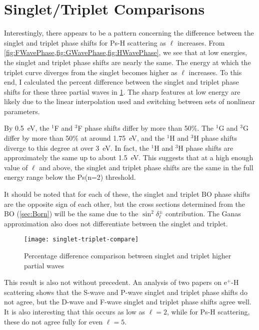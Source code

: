 \documentclass[Dissertation.tex]{subfiles}
\begin{document}
\section{Singlet/Triplet Comparisons}
\label{sec:SingTripCompare}

Interestingly, there appears to be a pattern concerning the difference between
the singlet and triplet phase shifts for Ps-H scattering as $\ell$ increases.
From \cref{fig:FWavePhase,fig:GWavePhase,fig:HWavePhase}, we see that at low
energies, the singlet and triplet phase shifts are nearly the same. The energy
at which the triplet curve diverges from the singlet becomes higher as $\ell$
increases. To this end, I calculated the percent difference between the singlet
and triplet phase shifts for these three partial waves in
\cref{fig:singlet-triplet-compare}. The sharp features at low energy are likely
due to the linear interpolation used and switching between sets of nonlinear 
parameters.

By \SI{0.5}{eV}, the $^1$F and $^3$F phase shifts differ by more than 50\%. The
$^1$G and $^3$G differ by more than 50\% at around \SI{1.75}{eV}, and the $^1$H
and $^3$H phase shifts diverge to this degree at over \SI{3}{eV}. In fact, the
$^1$H and $^3$H phase shifts are approximately the same up to about \SI{1.5}{eV}.
This suggests that at a high enough value of $\ell$ and above, the singlet and
triplet phase shifts are the same in the full energy range below the Ps(n=2)
threshold.

It should be noted that for each of these, the singlet and triplet
BO phase shifts are the opposite sign of each other, but the cross sections
determined from the BO (\cref{sec:Born}) will be the same due to the
$\sin^2 \! \delta_\ell^\pm$ contribution. The Ganas approximation also does
not differentiate between the singlet and triplet.

\begin{figure}
	\centering
	\texttt{[image: singlet-triplet-compare]}
	\caption[Singlet and triplet higher partial wave comparisons]{Percentage difference comparison between singlet and triplet higher partial waves}
	\label{fig:singlet-triplet-compare}
\end{figure}

This result is also not without precedent. An analysis of two papers on
e$^+$-H scattering \cite{Shertzer1994,Chen1997} shows that the S-wave and
P-wave singlet and triplet phase shifts do not agree, but the D-wave and
F-wave singlet and triplet phase shifts agree well. It is also interesting
that this occurs as low as $\ell = 2$, while for Ps-H scattering, these do
not agree fully for even $\ell = 5$.
\end{document}
